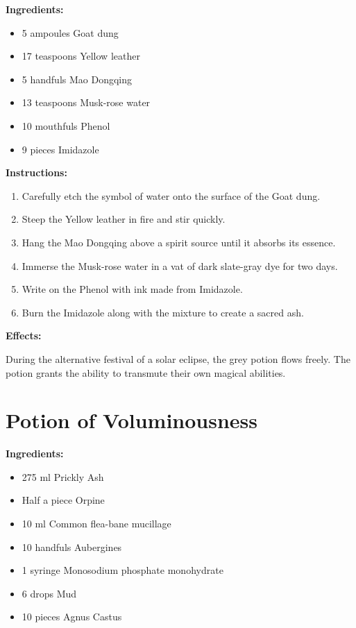 \documentclass{article}
\begin{document}
\textbf{Ingredients:}

\begin{itemize}
  \item 5 ampoules Goat dung
  \item 17 teaspoons Yellow leather
  \item 5 handfuls Mao Dongqing
  \item 13 teaspoons Musk-rose water
  \item 10 mouthfuls Phenol
  \item 9 pieces Imidazole
\end{itemize}

\textbf{Instructions:}

\begin{enumerate}
  \item Carefully etch the symbol of water onto the surface of the Goat dung.
  \item Steep the Yellow leather in fire and stir quickly.
  \item Hang the Mao Dongqing above a spirit source until it absorbs its essence.
  \item Immerse the Musk-rose water in a vat of dark slate-gray dye for two days.
  \item Write on the Phenol with ink made from Imidazole.
  \item Burn the Imidazole along with the mixture to create a sacred ash.
\end{enumerate}

\textbf{Effects:}

During the alternative festival of a solar eclipse, the grey potion flows freely. The potion grants the ability to transmute their own magical abilities.

\newpage
\section*{Potion of Voluminousness}

\textbf{Ingredients:}

\begin{itemize}
  \item 275 ml Prickly Ash
  \item Half a piece Orpine
  \item 10 ml Common flea-bane mucillage
  \item 10 handfuls Aubergines
  \item 1 syringe Monosodium phosphate monohydrate
  \item 6 drops Mud
  \item 10 pieces Agnus Castus
\end{itemize}
\end{document}
